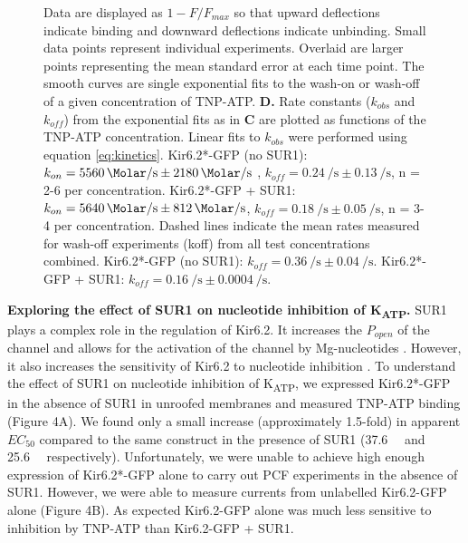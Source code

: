 \documentclass[9pt,lineno, onehalfspacing]{elife_modified}
\begin{document}
\begin{figure}
\begin{fullwidth}
{Data are displayed as $1 - F/F_{max}$ so that upward deflections indicate binding and downward deflections indicate unbinding.
Small data points represent individual experiments.
Overlaid are larger points representing the mean \pm standard error at each time point.
The smooth curves are single exponential fits to the wash-on or wash-off of a given concentration of TNP-ATP.
\textbf{D.}
Rate constants ($k_{obs}$ and $k_{off}$) from the exponential fits as in \textbf{C} are plotted as functions of the TNP-ATP concentration.
Linear fits to $k_{obs}$ were performed using equation \ref{eq:kinetics}.
Kir6.2*-GFP (no SUR1): $k_{on} = \SI{5560}{\per\Molar\per\second} \pm \SI{2180}{\per\Molar\per\second}$ , $k_{off} = \SI{0.24}{\per\second} \pm \SI{0.13}{\per\second}$, n = 2-6 per concentration.
Kir6.2*-GFP + SUR1: $k_{on} = \SI{5640}{\per\Molar\per\second} \pm \SI{812}{\per\Molar\per\second}$, $k_{off} = \SI{0.18}{\per\second} \pm \SI{0.05}{\per\second}$, n = 3-4 per concentration.
Dashed lines indicate the mean rates measured for wash-off experiments (koff) from all test concentrations combined.
Kir6.2*-GFP (no SUR1): $k_{off} = \SI{0.36}{\per\second} \pm \SI{0.04}{\per\second}$.
Kir6.2*-GFP + SUR1: $k_{off} = \SI{0.16}{\per\second} \pm \SI{0.0004}{\per\second}$.
}
\label{fig:four}
\end{fullwidth}
\end{figure}

\textbf{Exploring the effect of SUR1 on nucleotide inhibition of K\textsubscript{ATP}.}
SUR1 plays a complex role in the regulation of Kir6.2.
It increases the $P_{open}$ of the channel and allows for the activation of the channel by Mg-nucleotides \citep{RN59, RN10, RN83, RN77, RN85}.
However, it also increases the sensitivity of Kir6.2 to nucleotide inhibition \citep{RN83, RN77, RN85}.
To understand the effect of SUR1 on nucleotide inhibition of K\textsubscript{ATP}, we expressed Kir6.2*-GFP in the absence of SUR1 in unroofed membranes and measured TNP-ATP binding (Figure 4A).
We found only a small increase (approximately 1.5-fold) in apparent $EC_{50}$ compared to the same construct in the presence of SUR1 (\SI{37.6}{\micro\Molar} and \SI{25.6}{\micro\Molar} respectively).
Unfortunately, we were unable to achieve high enough expression of Kir6.2*-GFP alone to carry out PCF experiments in the absence of SUR1.
However, we were able to measure currents from unlabelled Kir6.2-GFP alone (Figure 4B).
As expected Kir6.2-GFP alone was much less sensitive to inhibition by TNP-ATP than Kir6.2-GFP + SUR1.
\end{document}
